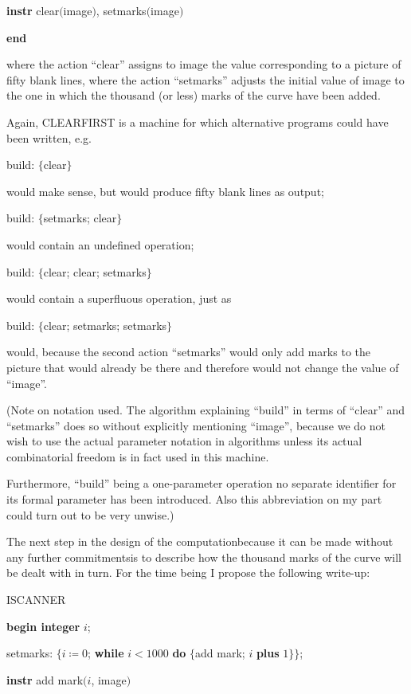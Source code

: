 \documentclass[twoside,11pt]{book}
\begin{document}
\quad \textbf{instr} clear$($image$)$, setmarks$($image$)$

\textbf{end}

\noindent
where the action ``clear'' assigns to image the value corresponding to a picture of fifty blank lines, where the action ``setmarks'' adjusts the initial value of image to the one in which the thousand (or less) marks of the curve have been added.

Again, CLEARFIRST is a machine for which alternative programs could have been written, e.g.

build: $\{$clear$\}$

\noindent
would make sense, but would produce fifty blank lines as output;

build: $\{$setmarks; clear$\}$

\noindent
would contain an undefined operation;

build: $\{$clear; clear; setmarks$\}$

\noindent
would contain a superfluous operation, just as

build: $\{$clear; setmarks; setmarks$\}$

\noindent
would, because the second action ``setmarks'' would only add marks to the picture that would already be there and therefore would not change the value of ``image''.

(Note on notation used. The algorithm explaining ``build'' in terms of ``clear'' and ``setmarks'' does so without explicitly mentioning ``image'', because we do not wish to use the actual parameter notation in algorithms unless its actual combinatorial freedom is in fact used in this machine.

Furthermore, ``build'' being a one-parameter operation no separate identifier for its formal parameter has been introduced. Also this abbreviation on my part could turn out to be very unwise.)

The next step in the design of the computation\textemdash{}because it can be made without any further commitments\textemdash{}is to describe how the thousand marks of the curve will be dealt with in turn. For the time being I propose the following write-up:

ISCANNER

\textbf{begin integer} $i$;

\quad setmarks: $\{i \coloneq 0$; \textbf{while} $i < 1000$ \textbf{do} $\{$add mark; $i$ \textbf{plus} $1\}\}$;

\quad \textbf{instr} add mark$(i$, image$)$
\end{document}
